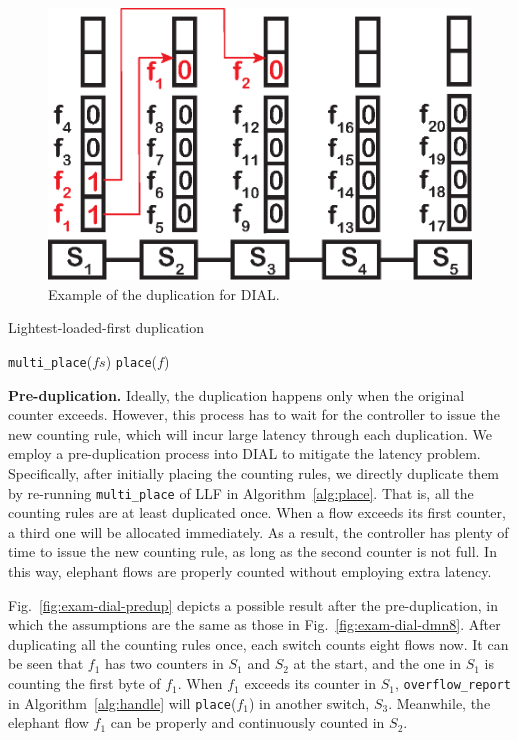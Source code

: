 \begin{figure}
    \centering
    \includegraphics[width=0.6\linewidth]{pic/exam-dial-place}
    \caption{Example of the duplication for DIAL.}
    \label{fig:exam-dial-place}
\end{figure}

\begin{algorithm}[t]\small
\caption{Lightest-loaded-first duplication}
\label{alg:place}
\BlankLine
\texttt{multi\_place}($fs$)
\BlankLine
\texttt{place}($f$)
\end{algorithm}

\textbf{Pre-duplication.}
Ideally, the duplication happens only when the original counter exceeds.
However, this process has to wait for the controller to issue the new counting rule, which will incur large latency through each duplication.
We employ a pre-duplication process into DIAL to mitigate the latency problem.
Specifically, after initially placing the counting rules, we directly duplicate them by re-running \texttt{multi\_place} of LLF in Algorithm~\ref{alg:place}.
That is, all the counting rules are at least duplicated once.
When a flow exceeds its first counter, a third one will be allocated immediately.
As a result, the controller has plenty of time to issue the new counting rule, as long as the second counter is not full.
In this way, elephant flows are properly counted without employing extra latency.

Fig.~\ref{fig:exam-dial-predup} depicts a possible result after the pre-duplication, in which the assumptions are the same as those in Fig.~\ref{fig:exam-dial-dmn8}.
After duplicating all the counting rules once, each switch counts eight flows now.
It can be seen that $f_1$ has two counters in $S_1$ and $S_2$ at the start, and the one in $S_1$ is counting the first byte of $f_1$.
When $f_1$ exceeds its counter in $S_1$, \texttt{overflow\_report} in Algorithm~\ref{alg:handle} will \texttt{place}($f_1$) in another switch, $S_3$. Meanwhile, the elephant flow $f_1$ can be properly and continuously counted in $S_2$.

